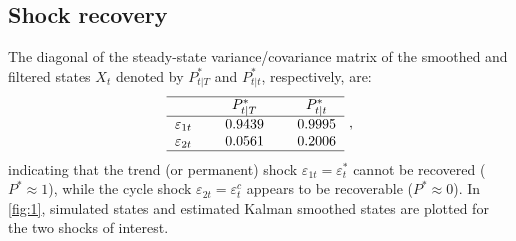 \documentclass[a4paper,final,12pt]{article}
\begin{document}
\subsection{Shock recovery}

The diagonal of the steady-state variance/covariance matrix of the smoothed
and filtered states $X_{t}$ denoted by $P_{t|T}^{\ast }$ and $P_{t|t}^{\ast
} $, respectively, are:%
\begin{equation}
\begin{tabular}{lcccc}
\hline
&  & $P_{t|T}^{\ast }$ &  & $P_{t|t}^{\ast }$ \\ \hline
{$\varepsilon _{1t}$} &  & $0.9439$ &  & $0.9995$ \\ 
{$\varepsilon _{2t}$} &  & $0.0561$ &  & $0.2006$ \\ \hline
\end{tabular}%
~,  \label{Pstar}
\end{equation}%
indicating that the trend (or permanent) shock $\varepsilon
_{1t}=\varepsilon _{t}^{\ast }$ cannot be recovered ($P^{\ast }\approx 1$),
while the cycle shock $\varepsilon _{2t}=\varepsilon _{t}^{c}$ appears to be
recoverable ($P^{\ast }\approx 0$). In \autoref{fig:1}, simulated states and
estimated Kalman smoothed states are plotted for the two shocks of interest.
\end{document}
